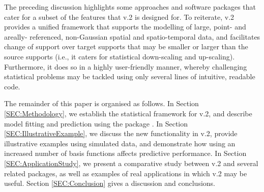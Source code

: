 \documentclass[nojss]{jss}
\begin{document}


The preceding discussion highlights some approaches and software packages that cater for a subset of the features that  v.2 is designed for. 
 To reiterate,  v.2 provides a unified framework that supports the modelling of large, point- and areally- referenced, non-Gaussian spatial and spatio-temporal data, and facilitates change of support over target supports that may be smaller or larger than the source supports (i.e., it caters for statistical down-scaling and up-scaling). Furthermore, it does so in a highly user-friendly manner, whereby challenging statistical problems may be tackled using only several lines of intuitive, readable code.





The remainder of this paper is organised as follows. 
In Section \ref{SEC:Methodology}, we establish the statistical framework for  v.2, and describe model fitting and prediction using the  package  \citep{Kristensen_2016_TMB}. 
In Section \ref{SEC:IllustrativeExample}, we discuss the new functionality in  v.2, provide illustrative examples using simulated data, %
 and demonstrate how using an increased number of basis functions affects predictive performance. %
In Section \ref{SEC:ApplicationStudy}, we present a comparative study between  v.2 and several related packages, as well as examples of real applications in which  v.2 may be useful.  
Section \ref{SEC:Conclusion} gives a discussion and conclusions. 
\end{document}
